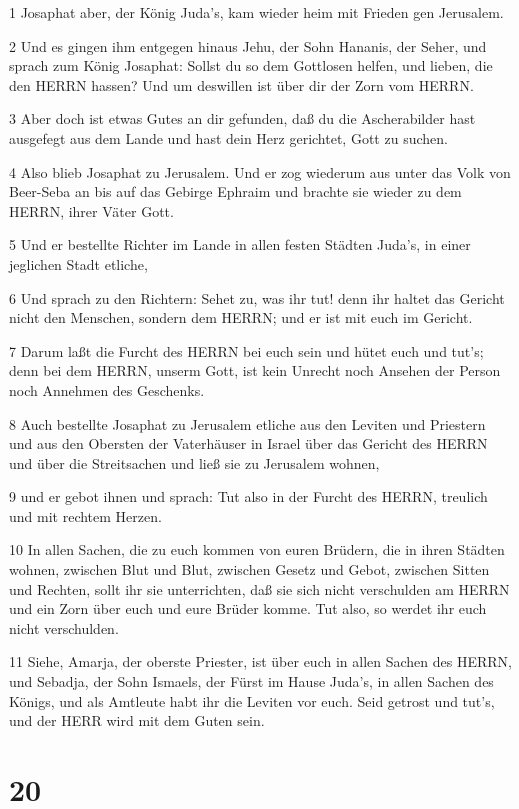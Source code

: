 \par 1 Josaphat aber, der König Juda's, kam wieder heim mit Frieden gen Jerusalem.
\par 2 Und es gingen ihm entgegen hinaus Jehu, der Sohn Hananis, der Seher, und sprach zum König Josaphat: Sollst du so dem Gottlosen helfen, und lieben, die den HERRN hassen? Und um deswillen ist über dir der Zorn vom HERRN.
\par 3 Aber doch ist etwas Gutes an dir gefunden, daß du die Ascherabilder hast ausgefegt aus dem Lande und hast dein Herz gerichtet, Gott zu suchen.
\par 4 Also blieb Josaphat zu Jerusalem. Und er zog wiederum aus unter das Volk von Beer-Seba an bis auf das Gebirge Ephraim und brachte sie wieder zu dem HERRN, ihrer Väter Gott.
\par 5 Und er bestellte Richter im Lande in allen festen Städten Juda's, in einer jeglichen Stadt etliche,
\par 6 Und sprach zu den Richtern: Sehet zu, was ihr tut! denn ihr haltet das Gericht nicht den Menschen, sondern dem HERRN; und er ist mit euch im Gericht.
\par 7 Darum laßt die Furcht des HERRN bei euch sein und hütet euch und tut's; denn bei dem HERRN, unserm Gott, ist kein Unrecht noch Ansehen der Person noch Annehmen des Geschenks.
\par 8 Auch bestellte Josaphat zu Jerusalem etliche aus den Leviten und Priestern und aus den Obersten der Vaterhäuser in Israel über das Gericht des HERRN und über die Streitsachen und ließ sie zu Jerusalem wohnen,
\par 9 und er gebot ihnen und sprach: Tut also in der Furcht des HERRN, treulich und mit rechtem Herzen.
\par 10 In allen Sachen, die zu euch kommen von euren Brüdern, die in ihren Städten wohnen, zwischen Blut und Blut, zwischen Gesetz und Gebot, zwischen Sitten und Rechten, sollt ihr sie unterrichten, daß sie sich nicht verschulden am HERRN und ein Zorn über euch und eure Brüder komme. Tut also, so werdet ihr euch nicht verschulden.
\par 11 Siehe, Amarja, der oberste Priester, ist über euch in allen Sachen des HERRN, und Sebadja, der Sohn Ismaels, der Fürst im Hause Juda's, in allen Sachen des Königs, und als Amtleute habt ihr die Leviten vor euch. Seid getrost und tut's, und der HERR wird mit dem Guten sein.

\chapter{20}

